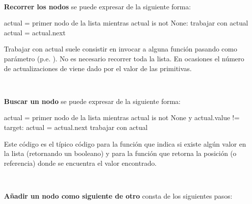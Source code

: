 \

\noindent \textbf{Recorrer los nodos} se puede expresar de la siguiente forma:
\label{pag:recorrerNodos}

\hfil\begin{minipage}{.38\textwidth}
\begin{pyverbatim}[][frame=single]
actual = primer nodo de la lista
mientras actual is not None:
  trabajar con actual
  actual = actual.next
\end{pyverbatim}
\end{minipage}

Trabajar con actual suele consistir en invocar a alguna función pasando como parámetro  (p.e. ).
No es necesario recorrer toda la lista. En ocasiones el número de actualizaciones de  viene dado por el valor  de las primitivas.


\

\noindent \textbf{Buscar un nodo} se puede expresar de la siguiente forma:

\hfil\begin{minipage}{.6\textwidth}
\begin{pyverbatim}[][frame=single]
actual = primer nodo de la lista
mientras actual is not None y actual.value != target:
  actual = actual.next
trabajar con actual
\end{pyverbatim}
\end{minipage}

Este código es el típico código para la función que indica si existe algún valor en la lista (retornando un booleano) y para la función que retorna la posición (o referencia) donde se encuentra el valor encontrado.


\

\noindent \textbf{Añadir un nodo como siguiente de otro} consta de los siguientes pasos:

